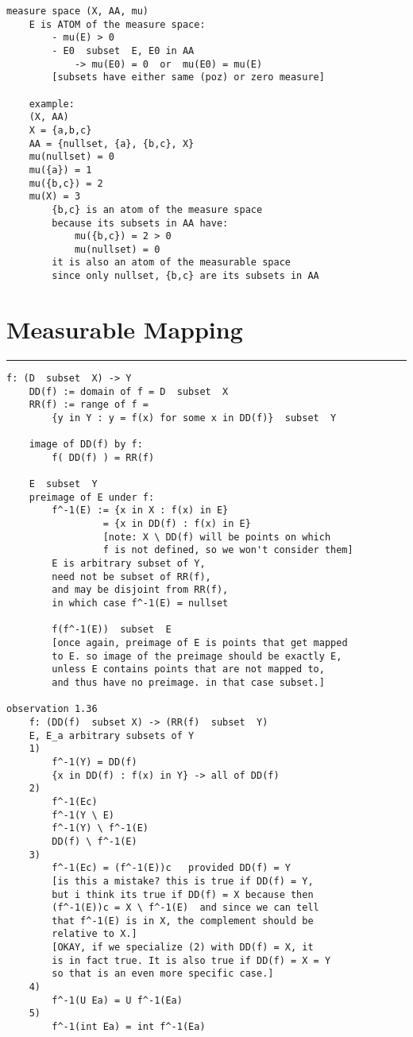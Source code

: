 \documentclass{article}
\begin{document}
\begin{flushleft}
\begin{verbatim}
measure space (X, AA, mu)
    E is ATOM of the measure space:
        - mu(E) > 0
        - E0  subset  E, E0 in AA
            -> mu(E0) = 0  or  mu(E0) = mu(E)
        [subsets have either same (poz) or zero measure]

    example:
    (X, AA)
    X = {a,b,c}
    AA = {nullset, {a}, {b,c}, X}
    mu(nullset) = 0 
    mu({a}) = 1
    mu({b,c}) = 2
    mu(X) = 3
        {b,c} is an atom of the measure space 
        because its subsets in AA have:
            mu({b,c}) = 2 > 0
            mu(nullset) = 0
        it is also an atom of the measurable space 
        since only nullset, {b,c} are its subsets in AA 
\end{verbatim}

\section*{Measurable Mapping}
\bigbreak
\hrule
\bigbreak

\begin{verbatim}
f: (D  subset  X) -> Y
    DD(f) := domain of f = D  subset  X 
    RR(f) := range of f = 
        {y in Y : y = f(x) for some x in DD(f)}  subset  Y

    image of DD(f) by f:
        f( DD(f) ) = RR(f)

    E  subset  Y
    preimage of E under f:
        f^-1(E) := {x in X : f(x) in E} 
                 = {x in DD(f) : f(x) in E}
                 [note: X \ DD(f) will be points on which 
                 f is not defined, so we won't consider them]
        E is arbitrary subset of Y,
        need not be subset of RR(f),
        and may be disjoint from RR(f),
        in which case f^-1(E) = nullset 

        f(f^-1(E))  subset  E
        [once again, preimage of E is points that get mapped 
        to E. so image of the preimage should be exactly E, 
        unless E contains points that are not mapped to,
        and thus have no preimage. in that case subset.]

observation 1.36
    f: (DD(f)  subset X) -> (RR(f)  subset  Y)
    E, E_a arbitrary subsets of Y
    1)
        f^-1(Y) = DD(f)
        {x in DD(f) : f(x) in Y} -> all of DD(f)
    2)
        f^-1(Ec)
        f^-1(Y \ E)
        f^-1(Y) \ f^-1(E)
        DD(f) \ f^-1(E)
    3)
        f^-1(Ec) = (f^-1(E))c   provided DD(f) = Y
        [is this a mistake? this is true if DD(f) = Y,
        but i think its true if DD(f) = X because then 
        (f^-1(E))c = X \ f^-1(E)  and since we can tell
        that f^-1(E) is in X, the complement should be 
        relative to X.]
        [OKAY, if we specialize (2) with DD(f) = X, it 
        is in fact true. It is also true if DD(f) = X = Y
        so that is an even more specific case.]
    4)
        f^-1(U Ea) = U f^-1(Ea)
    5)
        f^-1(int Ea) = int f^-1(Ea)


\end{verbatim}
\end{flushleft}
\end{document}
